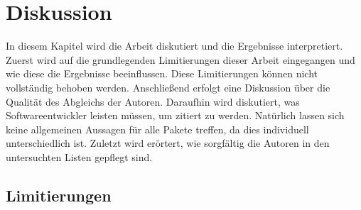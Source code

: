 
\chapter{Diskussion}
\label{chap:diskussion}
In diesem Kapitel wird die Arbeit diskutiert und die Ergebnisse interpretiert.
Zuerst wird auf die grundlegenden Limitierungen dieser Arbeit eingegangen und wie diese die Ergebnisse beeinflussen.
Diese Limitierungen können nicht vollständig behoben werden.
Anschließend erfolgt eine Diskussion über die Qualität des Abgleichs der Autoren.
Daraufhin wird diskutiert, was Softwareentwickler leisten müssen, um zitiert zu werden.
Natürlich lassen sich keine allgemeinen Aussagen für alle Pakete treffen, da dies individuell unterschiedlich ist.
Zuletzt wird erörtert, wie sorgfältig die Autoren in den untersuchten Listen gepflegt sind.

\section{Limitierungen}
\label{sec:limitierungen}
